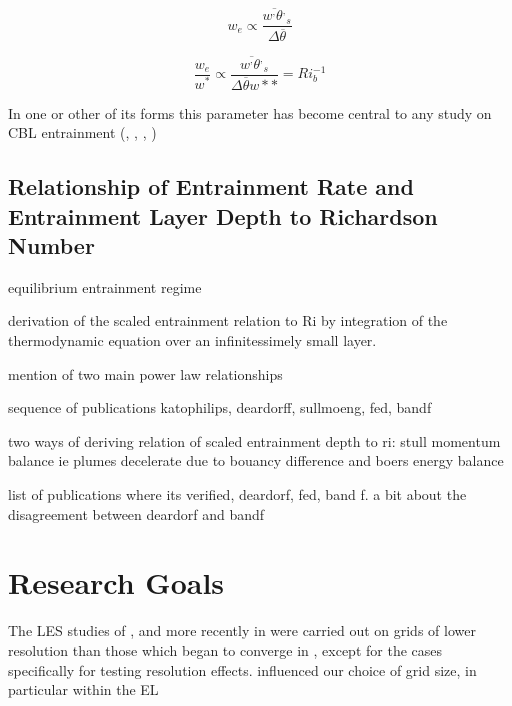 \begin{equation}
w_{e} \propto \frac{\overline{w^{,}\theta^{,}}_{s}}{\Delta \overline{\theta}}
\end{equation}

\begin{equation}
\frac{w_{e}}{w^{*}} \propto  \frac{\overline{w^{,}\theta^{,}}_{s}}{\Delta \overline{\theta} w*{*}} = Ri_{b}^{-1}
\end{equation}
 

In one or other of its forms this parameter has become central to any study on \acs{CBL} entrainment (\cite{SullMoengStev}, \cite{FedConzMir04}, \cite{Traum11}, \cite{BrooksFowler2})


\subsection{Relationship of Entrainment Rate and Entrainment Layer Depth to Richardson Number}

equilibrium entrainment regime

derivation of the scaled entrainment relation to Ri by integration of the thermodynamic equation over an infinitessimely small layer.

mention of two main power law relationships

sequence of publications katophilips, deardorff, sullmoeng, fed, bandf

two ways of deriving relation of scaled entrainment depth to ri: stull momentum balance ie plumes decelerate due to bouancy difference
and boers energy balance

list of publications where its verified, deardorf, fed, band f.  a bit about the disagreement between deardorf and bandf

\section{Research Goals}
\label{sec:ResearchGoals}

The LES studies of \citeauthor{SullMoengStev} \cite{SullMoengStev}, \citeauthor{FedConzMir04} \cite{FedConzMir04} and more recently \citeauthor{BrooksFowler2} in \cite{BrooksFowler2} were carried out on grids of lower resolution than those which began to converge in \citeauthor{SullPat} \cite{SullPat}, except for the cases specifically for testing resolution effects. \citeauthor{SullPat} \cite{SullPat} influenced our choice of grid size, in particular within the \acs{EL}\\

